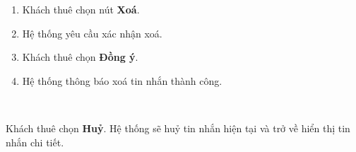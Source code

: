 \begin{usecase}
    
    \normalflow
    \begin{enumerate}
		\item Khách thuê chọn nút \textbf{Xoá}.
        \item Hệ thống yêu cầu xác nhận xoá.
        \item Khách thuê chọn \textbf{Đồng ý}.
        \item Hệ thống thông báo xoá tin nhắn thành công.
	\end{enumerate} \\ \hline
	
	\noalternative
    
    \exception
    \begin{itemize}
         Khách thuê chọn \textbf{Huỷ}. Hệ thống sẽ huỷ tin nhắn hiện tại và trở về hiển thị tin nhắn chi tiết.
    \end{itemize} \\ \hline
\end{usecase}